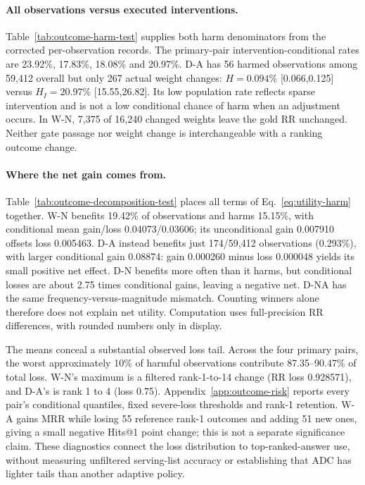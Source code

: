 \documentclass[11pt,a4paper]{article}
\begin{document}
\paragraph{All observations versus executed interventions.}
Table~\ref{tab:outcome-harm-test} supplies both harm denominators from the corrected per-observation records. The primary-pair intervention-conditional rates are 23.92\%, 17.83\%, 18.08\% and 20.97\%. D-A has 56 harmed observations among 59,412 overall but only 267 actual weight changes: $H=0.094$\% [0.066,0.125] versus $H_I=20.97$\% [15.55,26.82]. Its low population rate reflects sparse intervention and is not a low conditional chance of harm when an adjustment occurs. In W-N, 7,375 of 16,240 changed weights leave the gold RR unchanged. Neither gate passage nor weight change is interchangeable with a ranking outcome change.


\paragraph{Where the net gain comes from.}
Table~\ref{tab:outcome-decomposition-test} places all terms of Eq.~\eqref{eq:utility-harm} together. W-N benefits 19.42\% of observations and harms 15.15\%, with conditional mean gain/loss 0.04073/0.03606; its unconditional gain 0.007910 offsets loss 0.005463. D-A instead benefits just 174/59,412 observations (0.293\%), with larger conditional gain 0.08874: gain 0.000260 minus loss 0.000048 yields its small positive net effect. D-N benefits more often than it harms, but conditional losses are about 2.75 times conditional gains, leaving a negative net. D-NA has the same frequency-versus-magnitude mismatch. Counting winners alone therefore does not explain net utility. Computation uses full-precision RR differences, with rounded numbers only in display.


The means conceal a substantial observed loss tail. Across the four primary pairs, the worst approximately 10\% of harmful observations contribute 87.35--90.47\% of total loss. W-N's maximum is a filtered rank-1-to-14 change (RR loss 0.928571), and D-A's is rank 1 to 4 (loss 0.75). Appendix~\ref{app:outcome-risk} reports every pair's conditional quantiles, fixed severe-loss thresholds and rank-1 retention. W-A gains MRR while losing 55 reference rank-1 outcomes and adding 51 new ones, giving a small negative Hits@1 point change; this is not a separate significance claim. These diagnostics connect the loss distribution to top-ranked-answer use, without measuring unfiltered serving-list accuracy or establishing that ADC has lighter tails than another adaptive policy.
\end{document}
